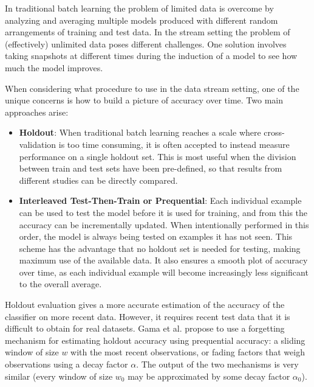 \documentclass[a4paper,12pt]{article}
\begin{document}
In traditional batch learning the problem of limited data is overcome
by analyzing and averaging multiple models produced with different random
arrangements of training and test data. In the stream setting the problem of
(effectively) unlimited data poses different challenges. One solution involves
taking snapshots at different times during the induction of a model to see how
much the model improves.

    When considering what procedure to use in the data stream setting, one of
the unique concerns is how to build a picture of accuracy over time. Two main
approaches arise:
\begin{itemize}
 \item {\bf Holdout}:
When traditional batch learning reaches a scale where cross-validation is too time 
consuming, it is often accepted to instead measure performance on a single holdout
set. This is most useful when the division between train and test sets have
been pre-defined, so that results from different studies can be directly compared. 
\item {\bf Interleaved Test-Then-Train or Prequential}:
 Each individual example can be used to test the model
before it is used for training, and from this the accuracy can be incrementally
updated. When intentionally performed in this order, the model is always
being tested on examples it has not seen. This scheme has the advantage that
no holdout set is needed for testing, making maximum use of the available
data. It also ensures a smooth plot of accuracy over time, as each individual
example will become increasingly less significant to the overall average.
\end{itemize}
   
Holdout evaluation gives a more accurate estimation of the accuracy of the classifier on more recent data. However, it requires recent test data that it is difficult to obtain for real datasets.
Gama et al. 
propose to use a forgetting mechanism for estimating holdout accuracy using
prequential
accuracy: a sliding window of size $w$ with the most recent
observations, or fading factors that weigh observations using a decay
factor $\alpha$. 
The output of the two mechanisms is very
similar (every window of size $w_0$ may be approximated by some decay
factor $\alpha_0$).
\end{document}
